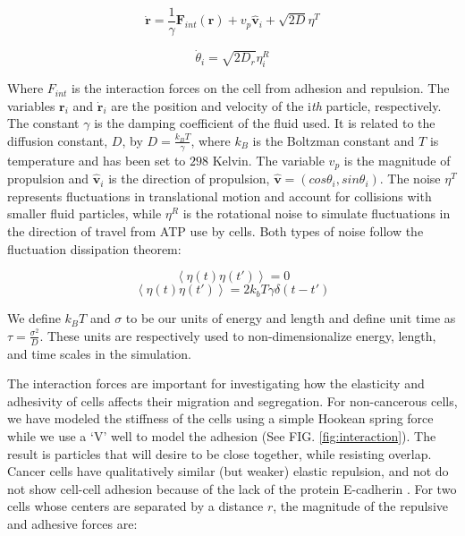 \documentclass[aps,prb,twocolumn,groupedaddress,nofootinbib,floatfix]{revtex4}
\begin{document}
\begin{equation}
  \bm{\dot{r}} = \frac{1}{\gamma}\bm{F}_{int}(\bm{r}) + v_p\hat{\bm{v}}_i+\sqrt{2D}\eta^T
\end{equation}

\begin{equation}
  \dot{\theta}_i=\sqrt{2D_r}\eta^R_i
\end{equation}

Where $F_{int}$ is the interaction forces on the cell from adhesion and repulsion.
The variables $\bm{r}_i$ and $\dot{\bm{r}}_i$ are the position and velocity of the i\textit{th} particle, respectively.
The constant $\gamma$ is the damping coefficient of the fluid used. It is related to the
diffusion constant, $D$, by $D=\frac{k_BT}{\gamma}$, where $k_B$ is the Boltzman constant and $T$ is temperature and has been set to $298$ Kelvin. 
The variable $v_p$ is the magnitude of propulsion and $\bm{\hat{v}}_i$ is the direction of propulsion, $\bm{\hat{v}}=(cos\theta_i, sin\theta_i)$.
The noise $\eta^T$ represents fluctuations in translational motion and account for collisions with smaller fluid particles, while
$\eta^R$ is the rotational noise to simulate fluctuations in the direction of travel from ATP use by cells. 
Both types of noise follow the fluctuation dissipation theorem:

\begin{equation}
\left\langle \eta(t)\eta(t')\right\rangle = 0 
\end{equation}
\begin{equation}
\left\langle \eta(t)\eta(t')\right\rangle = 2k_bT\gamma
\delta(t-t')
\end{equation}


We define $k_BT$ and $\sigma$ to be our units of energy and length and define 
unit time as $\tau = \frac{\sigma^2}{D}$. These units are respectively used to non-dimensionalize 
energy, length, and time scales in the simulation. 


The interaction forces are important for investigating how the elasticity and adhesivity of cells affects their migration and segregation. For non-cancerous cells, 
we have modeled the stiffness of the cells using a simple Hookean spring force while we use a `V' well to model the adhesion (See FIG. \ref{fig:interaction}). 
The result is particles that will desire to be close together, while resisting overlap. Cancer cells have qualitatively similar (but weaker) elastic repulsion, and not do not show 
cell-cell adhesion because of the lack of the protein E-cadherin \cite{Jeanes}. For two cells whose centers are separated by a distance $r$, the magnitude of the repulsive and adhesive forces are:
\end{document}
